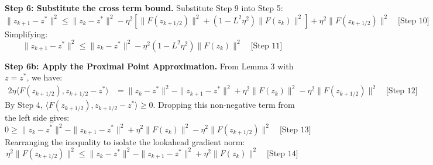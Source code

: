 \documentclass{article}
\begin{document}
\textbf{Step 6: Substitute the cross term bound.} Substitute Step 9 into Step 5:
$$
\|z_{k+1} - z^*\|^2 \leq \|z_k - z^*\|^2 - \eta^2 \left[ \|F(z_{k+1/2})\|^2 + (1 - L^2 \eta^2) \|F(z_k)\|^2 \right] + \eta^2 \|F(z_{k+1/2})\|^2 \quad \text{[Step 10]}
$$
Simplifying:
$$
\|z_{k+1} - z^*\|^2 \leq \|z_k - z^*\|^2 - \eta^2 (1 - L^2 \eta^2) \|F(z_k)\|^2 \quad \text{[Step 11]}
$$

\textbf{Step 6b: Apply the Proximal Point Approximation.} From Lemma 3 with $z = z^*$, we have:
\begin{align*}
2\eta \langle F(z_{k+1/2}), z_{k+1/2} - z^* \rangle &= \|z_k - z^*\|^2 - \|z_{k+1} - z^*\|^2 + \eta^2 \|F(z_k)\|^2 - \eta^2 \|F(z_{k+1/2})\|^2 \quad \text{[Step 12]}
\end{align*}
By Step 4, $\langle F(z_{k+1/2}), z_{k+1/2} - z^* \rangle \geq 0$. Dropping this non-negative term from the left side gives:
$$
0 \geq \|z_k - z^*\|^2 - \|z_{k+1} - z^*\|^2 + \eta^2 \|F(z_k)\|^2 - \eta^2 \|F(z_{k+1/2})\|^2 \quad \text{[Step 13]}
$$
Rearranging the inequality to isolate the lookahead gradient norm:
$$
\eta^2 \|F(z_{k+1/2})\|^2 \leq \|z_k - z^*\|^2 - \|z_{k+1} - z^*\|^2 + \eta^2 \|F(z_k)\|^2 \quad \text{[Step 14]}
$$
\end{document}
